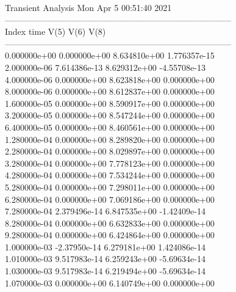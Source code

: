                                    Transient Analysis  Mon Apr  5 00:51:40  2021\\ \hline
--------------------------------------------------------------------------------\\ \hline
Index   time            V(5)            V(6)            V(8)            \\ \hline
--------------------------------------------------------------------------------\\ 	0.000000e+00	0.000000e+00	8.634810e+00	1.776357e-15	\\ 	2.000000e-06	7.614386e-13	8.629312e+00	-4.55708e-13	\\ 	4.000000e-06	0.000000e+00	8.623818e+00	0.000000e+00	\\ 	8.000000e-06	0.000000e+00	8.612837e+00	0.000000e+00	\\ 	1.600000e-05	0.000000e+00	8.590917e+00	0.000000e+00	\\ 	3.200000e-05	0.000000e+00	8.547244e+00	0.000000e+00	\\ 	6.400000e-05	0.000000e+00	8.460561e+00	0.000000e+00	\\ 	1.280000e-04	0.000000e+00	8.289820e+00	0.000000e+00	\\ 	2.280000e-04	0.000000e+00	8.029897e+00	0.000000e+00	\\ 	3.280000e-04	0.000000e+00	7.778123e+00	0.000000e+00	\\ 	4.280000e-04	0.000000e+00	7.534244e+00	0.000000e+00	\\ 	5.280000e-04	0.000000e+00	7.298011e+00	0.000000e+00	\\ 	6.280000e-04	0.000000e+00	7.069186e+00	0.000000e+00	\\ 	7.280000e-04	2.379496e-14	6.847535e+00	-1.42409e-14	\\ 	8.280000e-04	0.000000e+00	6.632833e+00	0.000000e+00	\\ 	9.280000e-04	0.000000e+00	6.424864e+00	0.000000e+00	\\ 	1.000000e-03	-2.37950e-14	6.279181e+00	1.424086e-14	\\ 	1.010000e-03	9.517983e-14	6.259243e+00	-5.69634e-14	\\ 	1.030000e-03	9.517983e-14	6.219494e+00	-5.69634e-14	\\ 	1.070000e-03	0.000000e+00	6.140749e+00	0.000000e+00	\\ \hline
